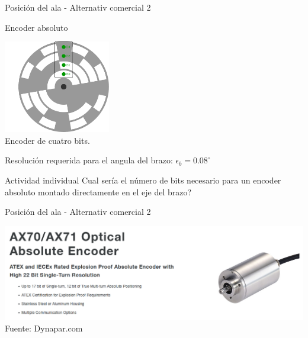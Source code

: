 \documentclass[presentation,aspectratio=169]{beamer}
\begin{document}
\begin{frame}[label={sec:orgf8dd10b}]{Posición del ala - Alternativ comercial 2}
\begin{block}{Encoder absoluto}
\begin{center}
\includegraphics[width=0.35\textwidth]{../../figures/encoder-disc-absolute}\\
Encoder de cuatro bits.
\end{center}

Resolución requerida para el angula del brazo: \(\epsilon_b = 0.08^\circ\)


\alert{Actividad individual} Cual sería el número de bits necesario para un encoder absoluto montado directamente en el eje del brazo?
\end{block}
\end{frame}

\begin{frame}[label={sec:org648aafe}]{Posición del ala - Alternativ comercial 2}
\begin{center}
\includegraphics[width=0.99\linewidth]{../../figures/dynapar-absolute-encoder.png}\\
{\footnotesize Fuente: Dynapar.com}
\end{center}
\end{frame}
\end{document}
